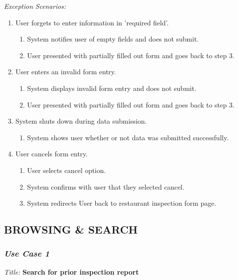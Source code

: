 \documentclass[twoside,letterpaper]{article}
\begin{document}
{\color{black} \textit{Exception Scenarios:}}
\begin{enumerate}
\item User forgets to enter information in 'required field'.
\begin{enumerate}
\item System notifies user of empty fields and does not submit.
\item User presented with partially filled out form and goes back to step 3.
\end{enumerate}

\item User enters an invalid form entry.
\begin{enumerate}
\item System displays invalid form entry and does not submit.
\item User presented with partially filled out form and goes back to step 3.
\end{enumerate}

\item System shuts down during data submission.
\begin{enumerate}
\item System shows user whether or not data was submitted successfully.
\end{enumerate}

\item User cancels form entry.
\begin{enumerate}
\item User selects cancel option.
\item System confirms with user that they selected cancel.
\item System redirects User back to restaurant inspection form page.
\end{enumerate}
\end{enumerate}

\subsection[BROWSING \& SEARCH]{\rmfamily\bfseries\color{black}
BROWSING \& SEARCH}

\subsubsection{\textit{Use Case 1}}

\textit{Title: }{\bfseries\color{black} Search for prior inspection report}
\end{document}
